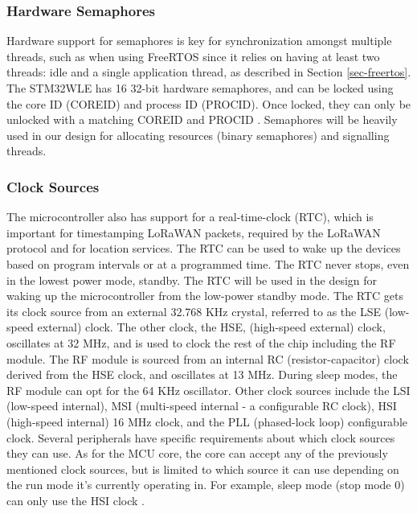
\subsubsection{Hardware Semaphores}
Hardware support for semaphores is key for synchronization amongst multiple threads, such as when
using FreeRTOS since it relies on having at least two threads: idle and a single application thread,
as described in Section \ref{sec-freertos}. The STM32WLE has 16 32-bit hardware semaphores, and can
be locked using the core ID (COREID) and process ID (PROCID). Once locked, they can only be unlocked
with a matching COREID and PROCID \cite{ds-stm32wle5j8}. Semaphores will be heavily used in our
design for allocating resources (binary semaphores) and signalling threads.

\subsubsection{Clock Sources}
The microcontroller also has support for a real-time-clock (RTC), which is important for
timestamping LoRaWAN packets, required by the LoRaWAN protocol and for location services. The RTC
can be used to wake up the devices based on program intervals or at a programmed time. The RTC never
stops, even in the lowest power mode, standby. The RTC will be used in the design for waking up the
microcontroller from the low-power standby mode. The RTC gets its clock source from an external
32.768 KHz crystal, referred to as the LSE (low-speed external) clock. The other clock, the HSE,
(high-speed external) clock, oscillates at 32 MHz, and is used to clock the rest of the chip
including the RF module. The RF module is sourced from an internal RC (resistor-capacitor) clock
derived from the HSE clock, and oscillates at 13 MHz. During sleep modes, the RF module can opt for
the 64 KHz oscillator. Other clock sources include the LSI (low-speed internal), MSI (multi-speed
internal - a configurable RC clock), HSI (high-speed internal) 16 MHz clock, and the PLL
(phased-lock loop) configurable clock. Several peripherals have specific requirements about which
clock sources they can use. As for the MCU core, the core can accept any of the previously mentioned
clock sources, but is limited to which source it can use depending on the run mode it's currently
operating in. For example, sleep mode (stop mode 0) can only use the HSI clock \cite{ds-stm32wle5j8}.

